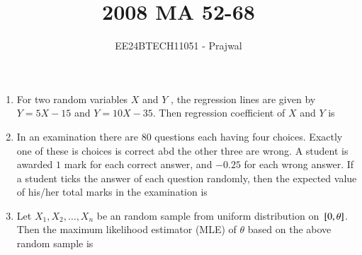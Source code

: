 \documentclass[journal,12pt,onecolumn]{IEEEtran}
\theoremstyle{remark}
\begin{document}

\vspace{3cm}

\title{2008 MA 52-68}
\author{EE24BTECH11051 - Prajwal}
\maketitle

\bigskip

\renewcommand{\thefigure}{\theenumi}
\renewcommand{\thetable}{\theenumi}


\begin{enumerate}
\item For two random variables $X$ and $Y$ , the regression lines are given by $Y=5X-15$ and $Y=10X-35$. Then regression coefficient of $X$ and $Y$ is
 \begin{enumerate}
\end{enumerate}


\item In an examination there are $80$ questions each having four choices. Exactly one of these is choices is correct abd the other three are wrong. A student is awarded $1$ mark for each correct answer, and $-0.25$ for each wrong answer. If a student ticks the answer of each question randomly, then the expected value of his/her total marks in the examination is 
\begin{enumerate}
\end{enumerate}

\item Let $X_1,X_2,\dots,X_n$ be an random sample from uniform distribution on ${}\left[0,\theta\right]$. Then the maximum likelihood estimator (MLE) of $\theta$ based on the above random sample is
\begin{enumerate}
\end{enumerate}


\end{enumerate}
\end{document}
